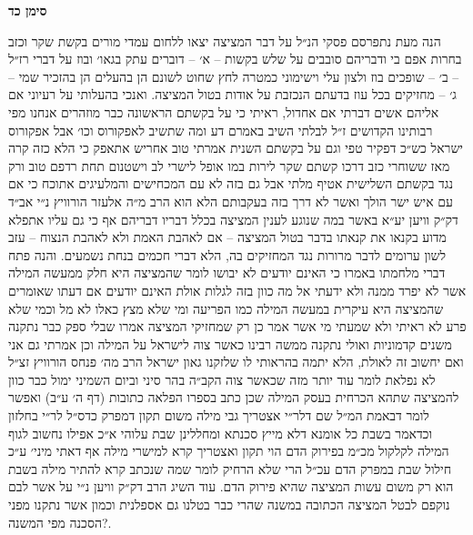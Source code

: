 \documentclass[12pt, openany]{book}
\newcommand{\chapname}{}
\newcommand{\newchap}[1]{
	\addcontentsline{toc}{chapter}{#1}
	\renewcommand{\chapname}{#1}
		\begin{center}
			\textbf{%
\fontsize{16pt}{16pt}\selectfont
				#1}
		\end{center}
}
\begin{document}
\newchap{סימן כד}
\begin{multicols}{2}
הנה מעת נתפרסם פסקי הנ״ל על דבר המציצה יצאו ללחום עמדי מורים בקשת שקר וכזב בחרות אפם בי ודבריהם סובבים על שלש בקשות – א׳ – דוברים עתק בגאו׳ ובוז על דברי רז״ל – ב׳ – שופכים בוז ולצון עלי וישימוני כמטרה לחץ שחוט לשונם הן בהעלים הן בהזכיר שמי – ג׳ – מחזיקים בכל עוז בדעתם הנכזבת על אודות בטול המציצה. ואנכי בהעלותי על רעיוני אם אליהם אשים דברתי אם אחדול, ראיתי כי על בקשתם הראשונה כבר מוזהרים אנחנו מפי רבותינו הקדושים ז״ל לבלתי השיב באמרם דע ומה שתשיב לאפקורוס וכו׳ אבל אפקורוס ישראל כש״כ דפקיר טפי וגם על בקשתם השנית אמרתי טוב אחריש אתאפק כי הלא כזה קרה מאז ששוחרי כזב דרכו קשתם שקר לירות במו אופל לישרי לב וישטנום תחת רדפם טוב ורק נגד בקשתם השלישית אטיף מלתי אבל גם בזה לא עם המכחישים והמלעיגים אתוכח כי אם עם איש ישר הולך ואשר לא דרך בזה בעקבותם הלא הוא הרב מ״ה אלעזר הורוויץ נ״י אב״ד דק״ק וויען יע״א באשר במה שנוגע לענין המציצה בכלל דבריו דבריהם אף כי גם עליו אתפלא מדוע בקנאו את קנאתו בדבר בטול המציצה – אם לאהבת האמת ולא לאהבת הנצוח – עזב לשון ערומים לדבר מרורות נגד המחזיקים בה, הלא דברי חכמים בנחת נשמעים. והנה פתח דברי מלחמתו באמרו כי האינם יודעים לא יבושו לומר שהמציצה היא חלק ממעשה המילה אשר לא יפרד ממנה ולא ידעתי אל מה כוון בזה לגלות אולת האינם יודעים אם דעתו שאומרים שהמציצה היא עיקרית במעשה המילה כמו הפריעה ומי שלא מצץ כאלו לא מל וכמי שלא פרע לא ראיתי ולא שמעתי מי אשר אמר כן רק שמחזיקי המציצה אמרו שבלי ספק כבר נתקנה משנים קדמוניות ואולי נתקנה ממשה רבינו כאשר צוה לישראל על המילה וכן אמרתי גם אני ואם יחשוב זה לאולת, הלא יתמה בהראותי לו שלזקנו גאון ישראל הרב מה׳ פנחס הורוויץ זצ״ל לא נפלאת לומר עוד יותר מזה שכאשר צוה הקב״ה בהר סיני וביום השמיני ימול כבר כוון להמציצה שתהא הכרחית בעסק המילה שכן כתב בספרו הפלאה כתובות (דף ה׳ ע״ב) ואפשר לומר דבאמת המ״ל שם דלר״י אצטריך גבי מילה משום תקון דמפרק כדס״ל לר״י בחלזון וכדאמר בשבת כל אומנא דלא מייץ סכנתא ומחללינן שבת עלוהי א״כ אפילו נחשוב לגוף המילה לקלקול מכ״מ בפירוק הדם הוי תקון ואצטריך קרא למישרי מילה אף דאתי מיני׳ ע״כ חילול שבת במפרק הדם עכ״ל הרי שלא הרחיק לומר שמה שנכתב קרא להתיר מילה בשבת הוא רק משום עשות המציצה שהיא פירוק הדם. עוד השיג הרב דק״ק וויען נ״י על אשר לבם נוקפם לבטל המציצה הכתובה במשנה שהרי כבר בטלנו גם אספלנית וכמון אשר נתקנו מפני הסכנה מפי המשנה?.\\\vspace{0pt}


\end{multicols}
\end{document}
